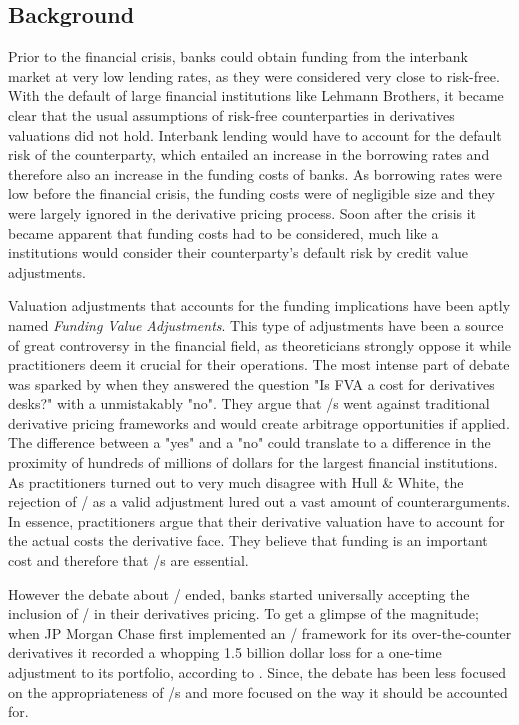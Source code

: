 \documentclass[main.tex]{subfiles}
\begin{document}
    \subsection{Background}
        
    Prior to the financial crisis, banks could obtain funding from the interbank market
    at very low lending rates, as they were considered very close to risk-free.
    With the default of large financial institutions like Lehmann Brothers, 
    it became clear that the usual assumptions of risk-free counterparties 
    in derivatives valuations did not hold.
    Interbank lending would have to account for the default risk of the counterparty,
    which entailed an increase in the borrowing rates 
    and therefore also an increase in the funding costs of banks.
    As borrowing rates were low before the financial crisis, 
    the funding costs were of negligible size 
    and they were largely ignored in the derivative pricing process.
    Soon after the crisis it became apparent that funding costs had to be considered,
    much like a institutions would consider their counterparty's default risk by 
    credit value adjustments.

    Valuation adjustments that accounts for the funding implications 
    have been aptly named \textit{Funding Value Adjustments}.
    This type of adjustments have been a source of great controversy in the financial field,
    as theoreticians strongly oppose it while practitioners deem it crucial for their operations.
    The most intense part of debate was sparked by \textcite{HullWhite2012FVA}
    when they answered the question "Is FVA a cost for derivatives desks?" 
    with a unmistakably "no".
    They argue that \FVA/s went against traditional derivative pricing frameworks
    and would create arbitrage opportunities if applied.
    The difference between a "yes" and a "no" could translate to a difference 
    in the proximity of hundreds of millions of dollars for the largest financial institutions.
    As practitioners turned out to very much disagree with Hull \& White,
    the rejection of \FVA/ as a valid adjustment lured out a vast amount of counterarguments.
    In essence, practitioners argue that their derivative valuation 
    have to account for the actual costs the derivative face.
    They believe that funding is an important cost and therefore that \FVA/s are essential.

    However the debate about \FVA/ ended, banks started universally accepting the inclusion of \FVA/
    in their derivatives pricing.
    To get a glimpse of the magnitude; when JP Morgan Chase first implemented an \FVA/ framework
    for its over-the-counter derivatives it recorded a whopping 1.5 billion dollar loss
    for a one-time adjustment to its portfolio, according to \textcite{JPMorganEarnings}.
    Since, the debate has been less focused on the appropriateness of \FVA/s
    and more focused on the way it should be accounted for.
\end{document}
